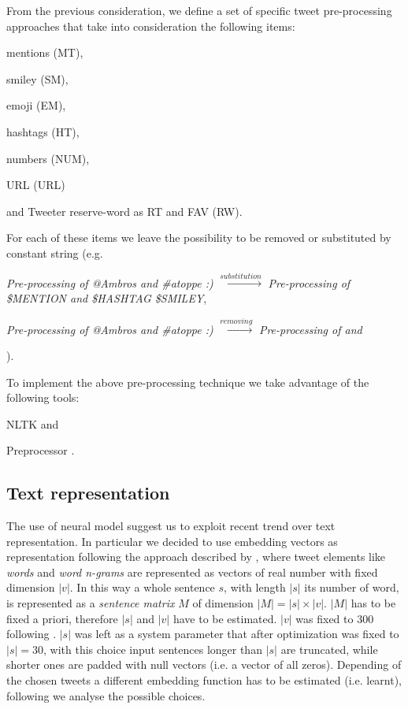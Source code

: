 From the previous consideration, we define a set of specific tweet pre-processing approaches that take into consideration the following items:
\begin{enumerate*}
\item mentions (MT),
\item smiley (SM),
\item emoji (EM),
\item hashtags (HT),
\item numbers (NUM),
\item URL (URL)
\item and Tweeter reserve-word as RT and FAV (RW).
\end{enumerate*}

For each of these items we leave the possibility to be removed or substituted by constant string (e.g.
\begin{enumerate*}
\item \emph{Pre-processing of @Ambros and \#atoppe :)} $\xrightarrow{substitution} $ \emph{Pre-processing of \$MENTION and \$HASHTAG \$SMILEY},
\item \emph{Pre-processing of @Ambros and \#atoppe :)} $\xrightarrow{removing} $ \emph{Pre-processing of and}
\end{enumerate*}
).

To implement the above pre-processing technique we take advantage of the following tools:
\begin{enumerate*}
\item NLTK \cite{nltk} and 
\item Preprocessor \cite{tweets-preprocessor}.
\end{enumerate*}



\subsection{Text representation} \label{subsec:representation}
The use of neural model suggest us to exploit recent trend over text representation. In particular we decided to use embedding vectors as representation following the approach described by \cite{bojanowski2016enriching}, where tweet elements like \emph{words} and \emph{word n-grams} are represented as vectors of real number with fixed dimension $|v|$.
In this way a whole sentence $s$, with length $|s|$ its number of word, is represented as a \emph{sentence matrix} $M$ of dimension $|M| = |s| \times |v|$. $|M|$ has to be fixed a priori, therefore $|s|$ and $|v|$ have to be estimated. $|v|$ was fixed to 300 following \cite{bojanowski2016enriching}. $|s|$ was left as a system parameter that after optimization was fixed to $|s| = 30$, with this choice 
input sentences longer than $|s|$ are truncated, while shorter ones are padded with null vectors (i.e. a vector of all zeros).
Depending of the chosen tweets a different embedding function has to be estimated (i.e. learnt), following we analyse the possible choices.

